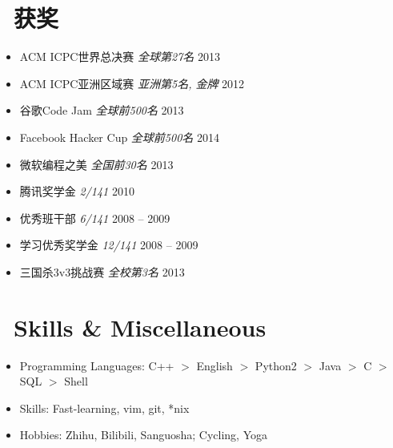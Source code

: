 \documentclass{resume}
\newcommand{\CS}{C\nolinebreak\hspace{-.05em}\raisebox{.6ex}{\scriptsize\bf{\#}}}
\newcommand{\dateditem}[3]{%
  \item {\par #1 \hspace{10pt} #2 \hfill #3 \par}%
}
\begin{document}
\section{\faHeartO\ 获奖}
\begin{itemize}[parsep=0.5ex]
  \dateditem{ACM ICPC世界总决赛}{\textit{全球第27名}}{2013}
  \dateditem{ACM ICPC亚洲区域赛}{\textit{亚洲第5名, 金牌}}{2012}
  \dateditem{谷歌Code Jam}{\textit{全球前500名}}{2013}
  \dateditem{Facebook Hacker Cup}{\textit{全球前500名}}{2014}
  \dateditem{微软编程之美}{\textit{全国前30名}}{2013}
  \dateditem{腾讯奖学金}{\textit{2/141}}{2010}
  \dateditem{优秀班干部}{\textit{6/141}}{2008 -- 2009}
  \dateditem{学习优秀奖学金}{\textit{12/141}}{2008 -- 2009}
  \dateditem{三国杀3v3挑战赛}{\textit{全校第3名}}{2013}
\end{itemize}



\section{\faCogs\ Skills \& Miscellaneous}
\begin{itemize}[parsep=0.5ex]
  \item Programming Languages: C++ $>$ English $>$ Python2 
          	$>$ Java $>$ \CS{} $>$ SQL $>$ Shell
  \item Skills: Fast-learning, vim, git, *nix
  \item Hobbies: Zhihu, Bilibili, Sanguosha; Cycling, Yoga
\end{itemize}
\end{document}
